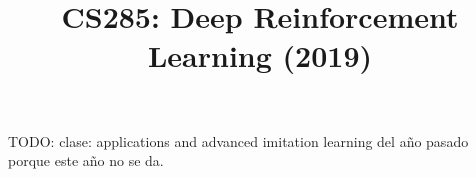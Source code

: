 \documentclass[a4paper]{report}
\title{CS285: Deep Reinforcement Learning (2019)}
\begin{document}
    \maketitle

    TODO: clase: applications and advanced imitation learning del año pasado porque este año no
    se da.

    
    

    \tableofcontents
\end{document}
